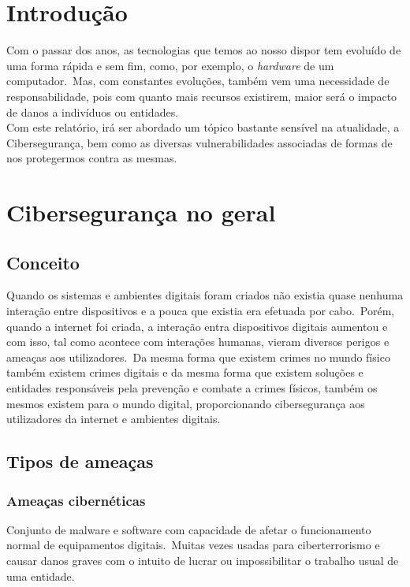 \documentclass{report}
\begin{document}
\tableofcontents
\listoftables     %
\listoffigures    %


\clearpage
{}

\chapter*{Introdução}
\label{ch:introducao}

Com o passar dos anos, as tecnologias que temos ao nosso dispor tem evoluído de uma forma rápida e sem fim, como, por exemplo, o \textit{hardware} de um computador.\ Mas, com constantes evoluções, também vem uma necessidade de responsabilidade, pois com quanto mais recursos existirem, maior será o impacto de danos a indivíduos ou entidades.\\

Com este relatório, irá ser abordado um tópico bastante sensível na atualidade, a Cibersegurança, bem como as diversas vulnerabilidades associadas de formas de nos protegermos contra as mesmas.

\chapter{Cibersegurança no geral}
\label{ch:ciberseguranca-no-geral}
\section{Conceito}
Quando os sistemas e ambientes digitais foram criados não existia quase nenhuma interação entre dispositivos e a pouca que existia era efetuada por cabo.\ Porém, quando a internet foi criada, a interação entra dispositivos digitais aumentou e com isso, tal como acontece com interações humanas, vieram diversos perigos e ameaças aos utilizadores.\ Da mesma forma que existem crimes no mundo físico também existem crimes digitais e da mesma forma que existem soluções e entidades responsáveis pela prevenção e combate a crimes físicos, também os mesmos existem para o mundo digital, proporcionando cibersegurança aos utilizadores da internet e ambientes digitais.

\section{Tipos de ameaças}
\subsection{Ameaças cibernéticas}
Conjunto de malware e software com capacidade de afetar o funcionamento normal de equipamentos digitais.\ Muitas vezes usadas para ciberterrorismo e causar danos graves com o intuito de lucrar ou impossibilitar o trabalho usual de uma entidade.\\
\end{document}
